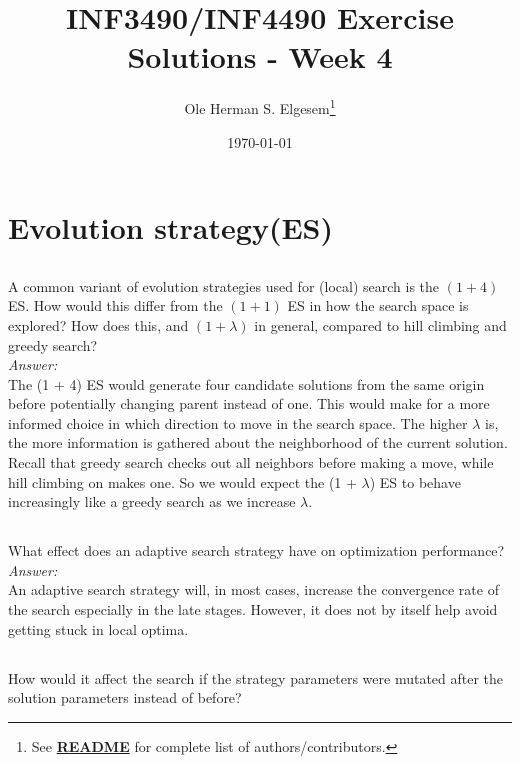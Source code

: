 \documentclass{article}           %
\title{\vspace{-2cm}INF3490/INF4490 Exercise Solutions - Week 4}
\author{Ole Herman S. Elgesem\footnote{See \href{https://github.com/olehermanse/INF3490-AI_Machine_Learning/blob/master/README.md}{\textbf{README}} for complete list of authors/contributors.}}
\date{\today}
\newcommand\marginsymbol[1][0pt]{%
  \tabto*{0cm}\makebox[\dimexpr-1cm-#1\relax][r]{$\mathbb{P}$}\tabto*{\TabPrevPos}}
\begin{document}
    \renewcommand\marginsymbol[1][0pt]{%
  \tabto*{0cm}\makebox[-1cm][c]{$\mathbb{P}$}\tabto*{\TabPrevPos}}

\maketitle


\section{Evolution strategy(ES)} %
\subsection{} %
A common variant of evolution strategies used for (local) search is the \((1 + 4)\) ES.
How would this differ from the \((1 + 1)\) ES in how the search space is explored?
How does this, and \((1 + \lambda)\) in general, compared to hill climbing and greedy search?\\

\textit{Answer:}\\

The (1 + 4) ES would generate four candidate solutions from the same origin before potentially changing parent instead of one.
This would make for a more informed choice in which direction to move in the search space.
The higher \(\lambda\) is, the more information is gathered about the neighborhood of the current solution.
Recall that greedy search checks out all neighbors before making a move, while hill climbing on makes one.
So we would expect the (1 + \(\lambda\)) ES to behave increasingly like a greedy search as we increase \(\lambda\).

\subsection{} %
What effect does an adaptive search strategy have on optimization performance?\\

\textit{Answer:}\\

An adaptive search strategy will, in most cases, increase the convergence rate of the search especially in the late stages.
However, it does not by itself help avoid getting stuck in local optima.

\subsection{} %
How would it affect the search if the strategy parameters were mutated after the solution parameters instead of before?\\
\end{document}

